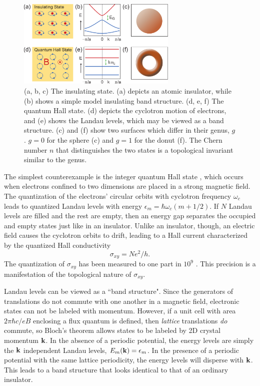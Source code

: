 \documentclass[twocolumn,floatfix,showpacs,rmp,aps]{revtex4}
\begin{document}
	\begin{figure}
		\includegraphics[width=3in]{Fig1}
		\caption{(a, b, c) The insulating state.  (a) depicts an atomic insulator, while
			(b) shows a simple model insulating band structure.  (d, e, f) The quantum Hall state.
			(d) depicts the cyclotron motion of electrons, and (e) shows the Landau levels, which may
			be viewed as a band structure.  (c) and (f) show two surfaces which differ in their genus, $g$.
			$g=0$ for the sphere (c) and $g=1$ for the donut (f).  The Chern number $n$ that distinguishes
			the two states is a topological invariant similar to the genus.}
		\label{fig:insulator}
	\end{figure}
	
	The simplest counterexample is the integer quantum Hall state
	\cite{vonklitzing80,prange87}, which
	occurs when electrons confined to two dimensions are placed in a
	strong magnetic field.  The quantization of the electrons' circular
	orbits with cyclotron frequency $\omega_c$
	leads to quantized Landau levels with
	energy $\epsilon_m=\hbar\omega_c (m+1/2)$.
	If $N$ Landau levels are filled and the rest are empty, then an energy gap
	separates the occupied and empty states just like in an
	insulator.  Unlike an insulator, though, an electric field causes
	the cyclotron orbits to drift, leading to a Hall
	current characterized by the quantized  Hall conductivity
	\begin{equation}
		\sigma_{xy} = N e^2/h.
		\label{qhall}
	\end{equation}
	The quantization of $\sigma_{xy}$ has been measured to
	one part in $10^9$ \cite{vonklitzing05}.  This precision is a
	manifestation of the topological nature of $\sigma_{xy}$.
	
	Landau levels can be viewed as a ``band
	structure".  Since the generators of translations do not commute with one another
	in a magnetic field, electronic states can
	not be labeled with momentum.  However, if a unit cell with
	area $2\pi \hbar c/e B$ enclosing a
	flux quantum is defined, then {\it lattice} translations
	{\it do} commute, so Bloch's theorem allows states to be labeled by
	2D crystal momentum ${\bf k}$.  In the absence of a periodic potential,
	the energy levels are simply the ${\bf k}$ independent
	Landau levels, $E_m({\bf k}) = \epsilon_m$.  In the presence of a periodic potential
	with the same lattice periodicity, the energy levels will
	disperse with ${\bf k}$.   This leads to a band structure
	that looks identical to that of an ordinary insulator.
	
\end{document}
